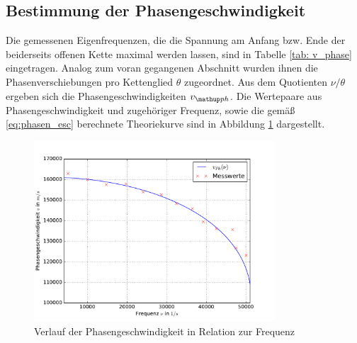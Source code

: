 \subsection{Bestimmung der Phasengeschwindigkeit}
Die gemessenen Eigenfrequenzen, die die Spannung am Anfang bzw. Ende der beiderseits
offenen Kette maximal werden lassen, sind in Tabelle \ref{tab: v_phase} eingetragen. Analog zum
voran gegangenen Abschnitt wurden ihnen die Phasenverschiebungen pro Kettenglied $\theta$
zugeordnet. Aus dem Quotienten $\nu / \theta$ ergeben sich die Phasengeschwindigkeiten $v\ua{ph}$.
Die Wertepaare aus Phasengeschwindigkeit und zugehöriger Frequenz, sowie die gemäß \eqref{eq:phasen_esc} berechnete
Theoriekurve sind in Abbildung \ref{fig: v_phase} dargestellt.

\begin{figure}
  \centering
  \includegraphics[width = 0.8\textwidth]{../Messdaten/plots/v_phase.pdf}
  \caption{Verlauf der Phasengeschwindigkeit in Relation zur Frequenz}
  \label{fig: v_phase}
\end{figure}


